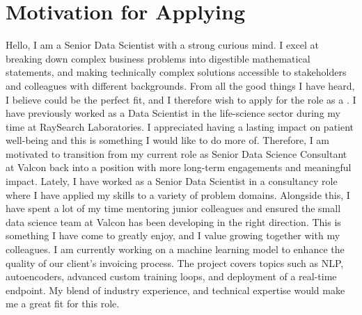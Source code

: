 \section{Motivation for Applying}
Hello, I am a Senior Data Scientist with a strong curious mind.
I excel at breaking down complex business problems into digestible mathematical statements, and making technically complex solutions accessible to stakeholders and colleagues with different backgrounds.
From all the good things I have heard, I believe \company{} could be the perfect fit, and I therefore wish to apply for the role as a \role{}. \newpar I have previously worked as a Data Scientist in the life-science sector during my time at RaySearch Laboratories.
I appreciated having a lasting impact on patient well-being and this is something I would like to do more of.
Therefore, I am motivated to transition from my current role as Senior Data Science Consultant at Valcon back into a position with more long-term engagements and meaningful impact. \newpar Lately, I have worked as a Senior Data Scientist in a consultancy role where I have applied my skills to a variety of problem domains.
Alongside this, I have spent a lot of my time mentoring junior colleagues and ensured the small data science team at Valcon has been developing in the right direction.
This is something I have come to greatly enjoy, and I value growing together with my colleagues. \newpar I am currently working on a machine learning model to enhance the quality of our client's invoicing process.
The project covers topics such as NLP, autoencoders, advanced custom training loops, and deployment of a real-time endpoint.
My blend of industry experience, and technical expertise would make me a great fit for this role.